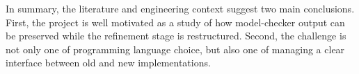 In summary, the literature and engineering context suggest two main
conclusions. First, the project is well motivated as a study of how
model-checker output can be preserved while the refinement stage is
restructured. Second, the challenge is not only one of programming
language choice, but also one of managing a clear interface between
old and new implementations.
